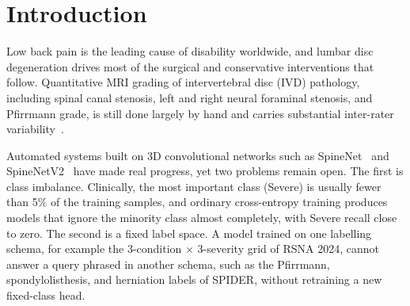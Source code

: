 \documentclass[runningheads]{llncs}
\begin{document}
\section{Introduction}\label{sec1}

Low back pain is the leading cause of disability worldwide, and lumbar disc degeneration drives most of the surgical and conservative interventions that follow. Quantitative MRI grading of intervertebral disc (IVD) pathology, including spinal canal stenosis, left and right neural foraminal stenosis, and Pfirrmann grade, is still done largely by hand and carries substantial inter-rater variability~\cite{nigru2024}.

Automated systems built on 3D convolutional networks such as SpineNet~\cite{jamaludin2017} and SpineNetV2~\cite{windsor2022} have made real progress, yet two problems remain open. The first is class imbalance. Clinically, the most important class (Severe) is usually fewer than 5\% of the training samples, and ordinary cross-entropy training produces models that ignore the minority class almost completely, with Severe recall close to zero. The second is a fixed label space. A model trained on one labelling schema, for example the 3-condition $\times$ 3-severity grid of RSNA 2024, cannot answer a query phrased in another schema, such as the Pfirrmann, spondylolisthesis, and herniation labels of SPIDER, without retraining a new fixed-class head.
\end{document}
